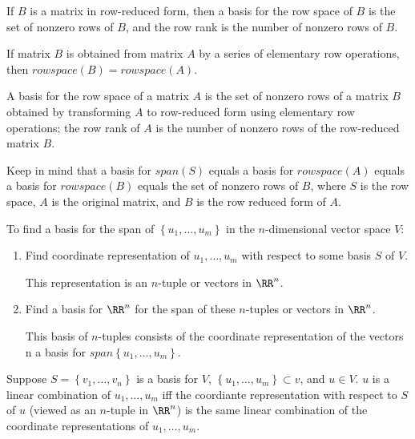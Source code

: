 \begin{theorem}
  If $B$ is a matrix in row-reduced form, then a basis for the row space of $B$ is the set of nonzero rows of $B$, and 
  the row rank is the number of nonzero rows of $B$.
\end{theorem}

\begin{theorem}
  If matrix $B$ is obtained from matrix $A$ by a series of elementary row operations, then $rowspace(B) = rowspace(A)$.
\end{theorem}

\begin{corollary}
  A basis for the row space of a matrix $A$ is the set of nonzero rows of a matrix $B$ obtained by transforming $A$ to row-reduced form using
  elementary row operations; the row rank of $A$ is the number of nonzero rows of the row-reduced matrix $B$.
\end{corollary}

Keep in mind that a basis for $span(S)$ equals a basis for $rowspace(A)$ equals a basis for $rowspace(B)$ equals the set of nonzero rows of $B$,
where $S$ is the row space, $A$ is the original matrix, and $B$ is the row reduced form of $A$.

To find a basis for the span of $\left\{u_{1}, \dots, u_{m}\right\}$ in the $n$-dimensional vector space $V$:
\begin{enumerate}
  \item Find coordinate representation of $u_{1}, \dots, u_{m}$ with respect to some basis $S$ of $V$.

    This representation is an $n$-tuple or vectors in $\RR^{n}$.
  \item Find a basis for $\RR^{n}$ for the span of these $n$-tuples or vectors in $\RR^{n}$.

    This basis of $n$-tuples consists of the coordinate representation of the vectors n a basis for $span \left\{u_{1}, \dots, u_{m}\right\}$.
\end{enumerate}

\begin{lemma}
  Suppose $S = \left\{v_{1}, \dots, v_{n}\right\}$ is a basis for $V$, $\left\{u_{1}, \dots, u_{m}\right\} \subset v$, and $u \in V$.
  $u$ is a linear combination of $u_{1}, \dots, u_{m}$ iff the coordiante representation with respect to $S$ of $u$ (viewed as an $n$-tuple in $\RR^{n}$)
  is the same linear combination of the coordinate representations of $u_{1}, \dots, u_{m}$.
\end{lemma}

